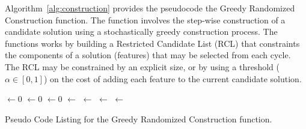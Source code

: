 Algorithm~\ref{alg:construction} provides the pseudocode the Greedy Randomized Construction function. The function involves the step-wise construction of a candidate solution using a stochastically greedy construction process. The functions works by building a Restricted Candidate List (RCL) that constraints the components of a solution (features) that may be selected from each cycle. The RCL may be constrained by an explicit size, or by using a threshold ($\alpha \in [0,1]$) on the cost of adding each feature to the current candidate solution.

\begin{algorithm}[htp]
	\SetLine

	\KwIn{\Alpha}
	\KwOut{\Candidate}
	\Candidate $\leftarrow 0$\;
	\While{\Candidate $\neq$ \ProblemSize} {
		\FeatureCosts $\leftarrow 0$\;
		\For{\ProblemFeature $\notin$ \Candidate}{
			\FeatureCosts $\leftarrow$ \CostImpactOfFeature{\Candidate, \ProblemFeature}\;
		}
		\RCL $\leftarrow 0$\;
		\ProblemFeatureMinCost $\leftarrow$ \MinCost{\FeatureCosts}\;
		\ProblemFeatureMaxCost $\leftarrow$ \MaxCost{\FeatureCosts}\;
		\For{\ProblemFeatureCost $\in$ \FeatureCosts} {
			\If{\ProblemFeatureCost $\leq$ $\ProblemFeatureMinCost + \alpha \cdot (\ProblemFeatureMaxCost - \ProblemFeatureMinCost)$ } {
				\RCL $\leftarrow$ \ProblemFeature\;
			}
		}
		\Candidate $\leftarrow$ \SelectRandomFeature{\RCL}\;
	}
	\Return{\Candidate}\;
	\caption{Pseudo Code Listing for the Greedy Randomized Construction function.}
	\label{alg:construction}
\end{algorithm}

